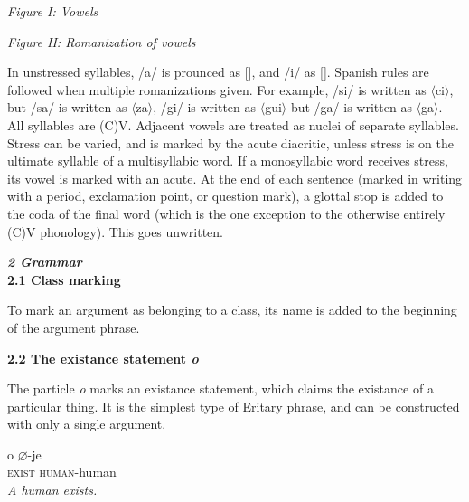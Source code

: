 \documentclass{article}[10pt]
\begin{document}
\begin{multicols}{2}
{\begin{center}
\emph{Figure I: Vowels}\\
 \Large
\begin{vowel}
\end{vowel} \end{center}}

{\begin{center}
\emph{Figure II: Romanization of vowels}\\
 \Large
\begin{vowel}
\end{vowel} \end{center}}
\end{multicols}

In unstressed syllables, /a/ is prounced as [], and /i/ as []. Spanish rules are followed when multiple romanizations given. For example, /si/ is written as $\langle$ci$\rangle$, but /sa/ is written as $\langle$za$\rangle$, /gi/ is written as $\langle$gui$\rangle$ but /ga/ is written as $\langle$ga$\rangle$. All syllables are (C)V. Adjacent vowels are treated as nuclei of separate syllables. Stress can be varied, and is marked by the acute diacritic, unless stress is on the ultimate syllable of a multisyllabic word. If a monosyllabic word receives stress, its vowel is marked with an acute. At the end of each sentence (marked in writing with a period, exclamation point, or question mark), a glottal stop is added to the coda of the final word (which is the one exception to the otherwise entirely (C)V phonology). This goes unwritten.

\clearpage
{\bf \emph{2 Grammar}}\\

{\bf 2.1 Class marking}

To mark an argument as belonging to a class, its name is added to the beginning of the argument phrase.

{\bf 2.2 The existance statement \emph{o}}

The particle \emph{o} marks an existance statement, which claims the existance of a particular thing. It is the simplest type of Eritary phrase, and can be constructed with only a single argument.

\begin{exe}
\ex
\gll o $\varnothing$-je\\
\textsc{exist} \textsc{human}-human\\
\trans \emph{A human exists.}
\end{exe}
\end{document}
